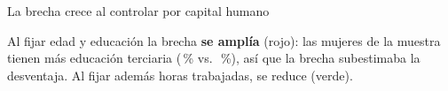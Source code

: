 \documentclass[aspectratio=169]{beamer}
\begin{document}
\begin{frame}{La brecha crece al controlar por capital humano}
\begin{center}
{%
}
\end{center}
\footnotesize Al fijar edad y educación la brecha \textbf{se amplía} (rojo): las mujeres de la muestra tienen más educación terciaria (\PctTertiaryWomen\,\% vs.\ \PctTertiaryMen\,\%), así que la brecha subestimaba la desventaja. Al fijar además horas trabajadas, se reduce (verde).
\end{frame}

\end{document}
